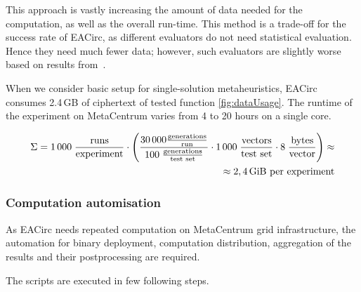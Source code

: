 \documentclass[
  print, %
  Table,   %
  nolof,     %
  nolot,     %
  11pt, %
  oneside  %
]{fithesis3}
\begin{document}
This approach is vastly increasing the amount of data needed for the computation, as well as the overall run-time. This method is a trade-off for the success rate of EACirc, as different evaluators do not need statistical evaluation. Hence they need much fewer data; however, such evaluators are slightly worse based on results from~\cite{svenda2013towards}.

When we consider basic setup for single-solution metaheuristics, EACirc consumes 2.4\,GB of ciphertext of tested function \cref{fig:dataUsage}. The runtime of the experiment on MetaCentrum varies from 4 to 20 hours on a single core.

\begin{figure*}[t]
    \begin{equation*}
        \begin{aligned}
    \Sigma = 1\,000 \;
             \frac{\textnormal{runs}}
                  {\textnormal{experiment}}
             \cdot
             \left(
             \frac{30\,000 \frac{\textnormal{generations}}{\textnormal{run}}}
                  {100 \; \frac{\textnormal{generations}}{\textnormal{test set}}}
             \cdot
             1\,000 \;
             \frac{\textnormal{vectors}}
                  {\textnormal{test set}}
             \cdot
             8 \;
             \frac{\textnormal{bytes}}
                  {\textnormal{vector}}
             \right) \approx\\
             \approx 2,4 \textnormal{\,GiB per experiment}
        \end{aligned}
    \end{equation*}
    \caption{The amount of data analyzed by EACirc for a single configuration of randomness testing experiment.}
    \label{fig:dataUsage}
\end{figure*}


\subsubsection{Computation automisation}
\label{subsubsec:method-spec-ss-auto}

As EACirc needs repeated computation on MetaCentrum grid infrastructure, the automation for binary deployment, computation distribution, aggregation of the results and their postprocessing are required.

The scripts are executed in few following steps.
\end{document}
